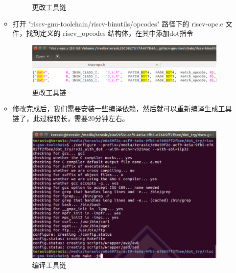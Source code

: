 \documentclass[a4paper, 14pt, oneside]{book} %
\numberwithin{equation}{subsection}
\begin{document}
\begin{enumerate}
\begin{itemize}
\begin{figure}[H]
						\caption{更改工具链}
					\end{figure}
				\item 打开 "riscv-gnu-toolchain/riscv-binutils/opcodes" 路径下的 riscv-opc.c 文件，找到定义的 riscv\_opcodes 结构体，在其中添加dot指令
					\begin{figure}[H]
						\centering  
						\includegraphics[scale=0.5]{img/5.png} 
						\caption{更改工具链}
					\end{figure}
				\item 修改完成后，我们需要安装一些编译依赖，然后就可以重新编译生成工具链了，此过程较长，需要20分钟左右。
					\begin{figure}[H]
						\centering  
						\includegraphics[scale=0.8]{img/COMPILE.JPG} 
						\caption{编译工具链}
					\end{figure}
			\end{itemize}
			

\end{enumerate}
\end{document}
